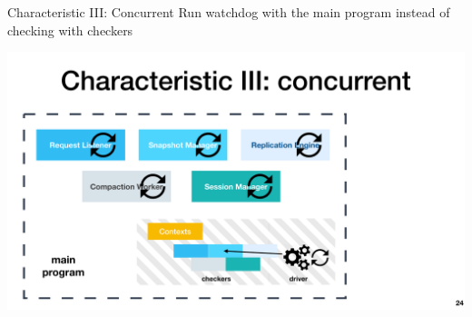 \documentclass[aspectratio=169]{beamer}
\newcommand{\red}[1]{{\color{red}{#1}}}
\newcommand{\blue}[1]{{\color{blue}{#1}}}
\begin{document}
\begin{frame}{Characteristic III: Concurrent}
    Run watchdog \red{concurrently} with the main program instead of \blue{in-place} checking with \blue{inserted} checkers
    \begin{center}
        \includegraphics[width=.75
            \textwidth]{fig/concurrent}
    \end{center}
\end{frame}
\end{document}
